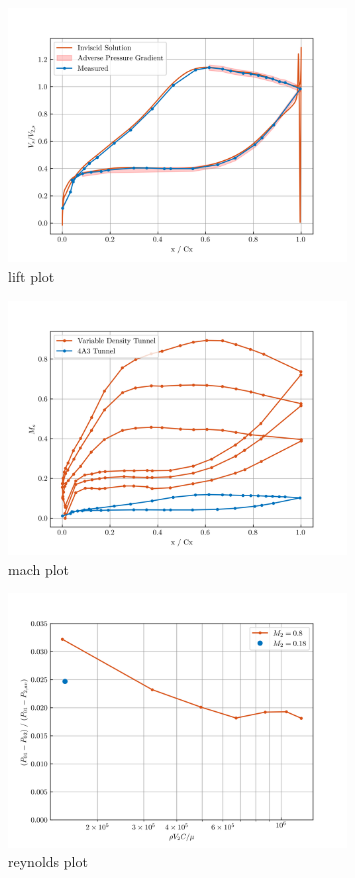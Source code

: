 \documentclass{article}
\begin{document}
\begin{figure}[H]
    \centering
    \includegraphics[width=0.8\textwidth]{figures/lift_plot.png}
    \caption{lift plot}
    \label{fig:lift_plot}
\end{figure}
\begin{figure}[H]
    \centering
    \includegraphics[width=0.8\textwidth]{figures/mach_plot.png}
    \caption{mach plot}
    \label{fig:mach_plot}
\end{figure}
\begin{figure}[H]
    \centering
    \includegraphics[width=0.8\textwidth]{figures/reynolds_plot.png}
    \caption{reynolds plot}
    \label{fig:reynolds_plot}
\end{figure}
\end{document}
